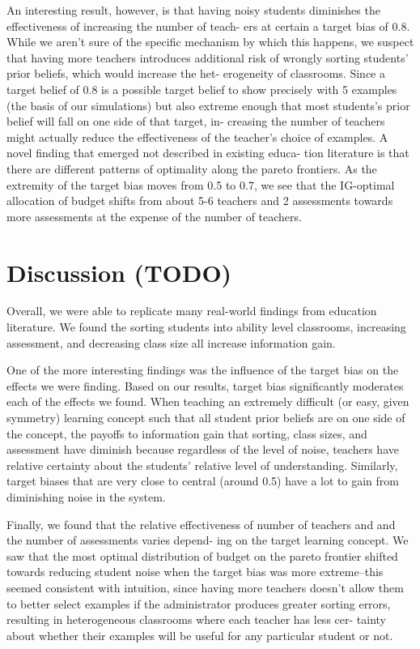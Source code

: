 \documentclass[10pt, letterpaper]{article}
\begin{document}
An interesting result, however, is that having noisy students diminishes
the effectiveness of increasing the number of teach- ers at certain a
target bias of 0.8. While we aren't sure of the specific mechanism by
which this happens, we suspect that having more teachers introduces
additional risk of wrongly sorting students' prior beliefs, which would
increase the het- erogeneity of classrooms. Since a target belief of 0.8
is a possible target belief to show precisely with 5 examples (the basis
of our simulations) but also extreme enough that most students's prior
belief will fall on one side of that target, in- creasing the number of
teachers might actually reduce the effectiveness of the teacher's choice
of examples. A novel finding that emerged not described in existing
educa- tion literature is that there are different patterns of
optimality along the pareto frontiers. As the extremity of the target
bias moves from 0.5 to 0.7, we see that the IG-optimal allocation of
budget shifts from about 5-6 teachers and 2 assessments towards more
assessments at the expense of the number of teachers.

\section{Discussion (TODO)}\label{discussion-todo}

Overall, we were able to replicate many real-world findings from
education literature. We found the sorting students into ability level
classrooms, increasing assessment, and decreasing class size all
increase information gain.

One of the more interesting findings was the influence of the target
bias on the effects we were finding. Based on our results, target bias
significantly moderates each of the effects we found. When teaching an
extremely difficult (or easy, given symmetry) learning concept such that
all student prior beliefs are on one side of the concept, the payoffs to
information gain that sorting, class sizes, and assessment have diminish
because regardless of the level of noise, teachers have relative
certainty about the students' relative level of understanding.
Similarly, target biases that are very close to central (around 0.5)
have a lot to gain from diminishing noise in the system.

Finally, we found that the relative effectiveness of number of teachers
and and the number of assessments varies depend- ing on the target
learning concept. We saw that the most optimal distribution of budget on
the pareto frontier shifted towards reducing student noise when the
target bias was more extreme--this seemed consistent with intuition,
since having more teachers doesn't allow them to better select examples
if the administrator produces greater sorting errors, resulting in
heterogeneous classrooms where each teacher has less cer- tainty about
whether their examples will be useful for any particular student or not.
\end{document}
